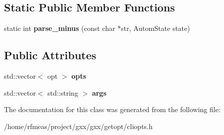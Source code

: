 \subsection*{Static Public Member Functions}
\begin{DoxyCompactItemize}
\item 
static int {\bfseries parse\+\_\+minus} (const char $\ast$str, Autom\+State state)\hypertarget{classgxx_1_1cliopts_a4ba523bd1d654e172d2c702074ffb05c}{}\label{classgxx_1_1cliopts_a4ba523bd1d654e172d2c702074ffb05c}

\end{DoxyCompactItemize}
\subsection*{Public Attributes}
\begin{DoxyCompactItemize}
\item 
std\+::vector$<$ opt $>$ {\bfseries opts}\hypertarget{classgxx_1_1cliopts_aef4202cb222c470006844b6f47c8f4e9}{}\label{classgxx_1_1cliopts_aef4202cb222c470006844b6f47c8f4e9}

\item 
std\+::vector$<$ std\+::string $>$ {\bfseries args}\hypertarget{classgxx_1_1cliopts_aee87a5426becb3b13b9c00655009aa4e}{}\label{classgxx_1_1cliopts_aee87a5426becb3b13b9c00655009aa4e}

\end{DoxyCompactItemize}


The documentation for this class was generated from the following file\+:\begin{DoxyCompactItemize}
\item 
/home/rfmeas/project/gxx/gxx/getopt/cliopts.\+h\end{DoxyCompactItemize}
